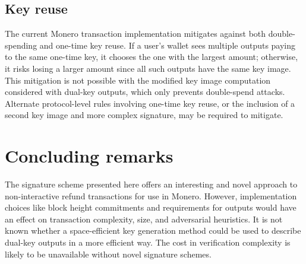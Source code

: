 \documentclass{mrl}
\begin{document}
\subsection{Key reuse}
The current Monero transaction implementation mitigates against both double-spending and one-time key reuse. If a user's wallet sees multiple outputs paying to the same one-time key, it chooses the one with the largest amount; otherwise, it risks losing a larger amount since all such outputs have the same key image. This mitigation is not possible with the modified key image computation considered with dual-key outputs, which only prevents double-spend attacks. Alternate protocol-level rules involving one-time key reuse, or the inclusion of a second key image and more complex signature, may be required to mitigate.

\section{Concluding remarks}
The signature scheme presented here offers an interesting and novel approach to non-interactive refund transactions for use in Monero. However, implementation choices like block height commitments and requirements for outputs would have an effect on transaction complexity, size, and adversarial heuristics. It is not known whether a space-efficient key generation method could be used to describe dual-key outputs in a more efficient way. The cost in verification complexity is likely to be unavailable without novel signature schemes.



\end{document}
